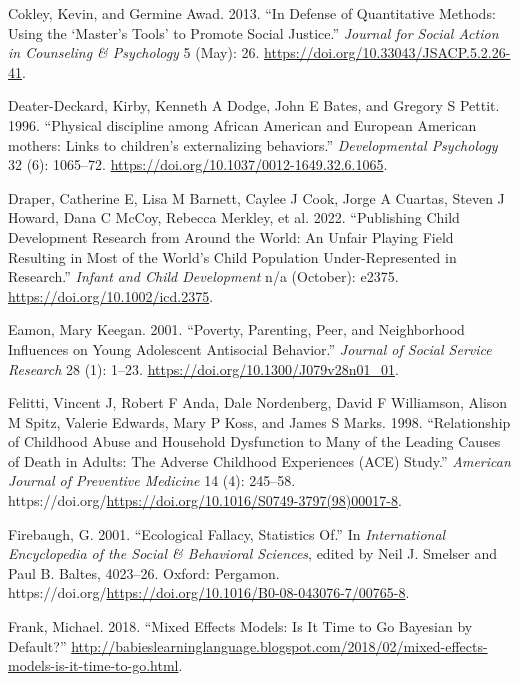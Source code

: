 \documentclass[
  letterpaper,
  DIV=11,
  numbers=noendperiod]{scrreprt}
\newlength{\cslhangindent}
\newlength{\cslentryspacingunit} %
\newenvironment{CSLReferences}[2] %
 {%
  \setlength{\parindent}{0pt}
  \ifodd #1
  \let\oldpar\par
  \def\par{\hangindent=\cslhangindent\oldpar}
  \fi
  \setlength{\parskip}{#2\cslentryspacingunit}
 }%
 {}
\begin{document}
\begin{CSLReferences}{1}{0}
\leavevmode{}%
Cokley, Kevin, and Germine Awad. 2013. {``In Defense of Quantitative
Methods: Using the {`Master's Tools'} to Promote Social Justice.''}
\emph{Journal for Social Action in Counseling \& Psychology} 5 (May):
26. \url{https://doi.org/10.33043/JSACP.5.2.26-41}.

\leavevmode{}%
Deater-Deckard, Kirby, Kenneth A Dodge, John E Bates, and Gregory S
Pettit. 1996. {``{Physical discipline among African American and
European American mothers: Links to children's externalizing
behaviors.}''} \emph{Developmental Psychology} 32 (6): 1065--72.
\url{https://doi.org/10.1037/0012-1649.32.6.1065}.

\leavevmode{}%
Draper, Catherine E, Lisa M Barnett, Caylee J Cook, Jorge A Cuartas,
Steven J Howard, Dana C McCoy, Rebecca Merkley, et al. 2022.
{``Publishing Child Development Research from Around the World: An
Unfair Playing Field Resulting in Most of the World's Child Population
Under-Represented in Research.''} \emph{Infant and Child Development}
n/a (October): e2375. \url{https://doi.org/10.1002/icd.2375}.

\leavevmode{}%
Eamon, Mary Keegan. 2001. {``{Poverty, Parenting, Peer, and Neighborhood
Influences on Young Adolescent Antisocial Behavior}.''} \emph{Journal of
Social Service Research} 28 (1): 1--23.
\url{https://doi.org/10.1300/J079v28n01_01}.

\leavevmode{}%
Felitti, Vincent J, Robert F Anda, Dale Nordenberg, David F Williamson,
Alison M Spitz, Valerie Edwards, Mary P Koss, and James S Marks. 1998.
{``Relationship of Childhood Abuse and Household Dysfunction to Many of
the Leading Causes of Death in Adults: The Adverse Childhood Experiences
(ACE) Study.''} \emph{American Journal of Preventive Medicine} 14 (4):
245--58.
https://doi.org/\url{https://doi.org/10.1016/S0749-3797(98)00017-8}.

\leavevmode{}%
Firebaugh, G. 2001. {``Ecological Fallacy, Statistics Of.''} In
\emph{International Encyclopedia of the Social \& Behavioral Sciences},
edited by Neil J. Smelser and Paul B. Baltes, 4023--26. Oxford:
Pergamon.
https://doi.org/\url{https://doi.org/10.1016/B0-08-043076-7/00765-8}.

\leavevmode{}%
Frank, Michael. 2018. {``Mixed Effects Models: Is It Time to Go
{B}ayesian by Default?''}
\url{http://babieslearninglanguage.blogspot.com/2018/02/mixed-effects-models-is-it-time-to-go.html}.


\end{CSLReferences}
\end{document}
